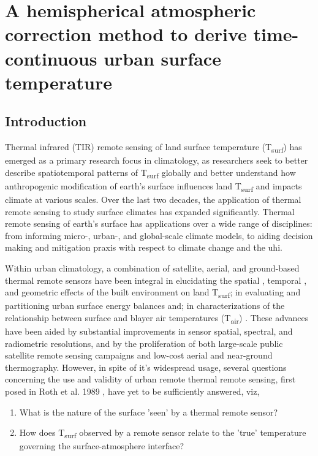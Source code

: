 \chapter{A hemispherical atmospheric correction method to derive time-continuous urban surface temperature}\label{paper1}

\section{Introduction}
Thermal infrared (TIR) remote sensing of land surface temperature (T\textsubscript{surf}) has emerged as a primary research focus in climatology, as researchers seek to better describe spatiotemporal patterns of T\textsubscript{surf} globally and better understand how anthropogenic modification of earth's surface influences land T\textsubscript{surf} and impacts climate at various scales. Over the last two decades, the application of thermal remote sensing to study surface climates has expanded significantly. Thermal remote sensing of earth's surface has applications over a wide range of disciplines: from informing micro-, urban-, and global-scale climate models, to aiding decision making and mitigation praxis with respect to climate change and the \gls{uhi}. 

Within urban climatology, a combination of satellite, aerial, and ground-based thermal remote sensors have been integral in elucidating the spatial \cite{Roth1989}, temporal \cite{Peng2012}, and geometric \cite{Voogt1997} effects of the built environment on land T\textsubscript{surf}; in evaluating and partitioning urban surface energy balances \cite{BastiaanssenW.G.M.1998, Yamaguchi2005} and; in characterizations of the relationship between surface and \gls{blayer} air temperatures (T\textsubscript{air}) \cite{Stoll1992}. These advances have been aided by substantial improvements in sensor spatial, spectral, and radiometric resolutions, and by the proliferation of both large-scale public satellite remote sensing campaigns and low-cost aerial and near-ground thermography. However, in spite of it's widespread usage, several questions concerning the use and validity of urban remote thermal remote sensing, first posed in Roth et al. 1989 \citet{Roth1989}, have yet to be sufficiently answered, viz,

\begin{enumerate}
	\item What is the nature of the surface 'seen' by a thermal remote sensor?
	\item How does T\textsubscript{surf} observed by a remote sensor relate to the 'true' temperature governing the surface-atmosphere interface?
\end{enumerate}

